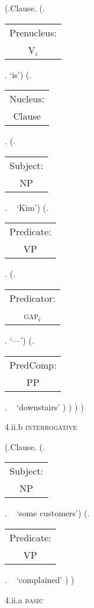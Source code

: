\documentclass[12pt,letterpaper]{article}
\begin{document}
\begin{figure}
	\begin{center}
		\begin{parsetree}
			(.Clause.
			(.\begin{tabular}{c}Prenucleus:\\V$_i$\end{tabular}. `is')
			(.\begin{tabular}{c}Nucleus:\\Clause\end{tabular}.
			(.\begin{tabular}{c}Subject:\\NP\end{tabular}.  ~ `Kim')
			(.\begin{tabular}{c}Predicate:\\VP\end{tabular}.
			(.\begin{tabular}{c}Predicator:\\\textsc{gap}$_i$\end{tabular}. `---')
			(.\begin{tabular}{c}PredComp:\\PP\end{tabular}. ~  `downstairs' )
			)
			)
			)
			
			\hfill \break\hfill \break
		\end{parsetree}
		4.ii.b \textsc{interrogative}
	\end{center}
\end{figure}

	\begin{figure}
	\begin{center}
		\begin{parsetree}
			(.Clause.
			(.\begin{tabular}{c}Subject:\\NP\end{tabular}.  ~ `some customers')
			(.\begin{tabular}{c}Predicate:\\VP\end{tabular}. ~  `complained' )
			)
			
			\hfill \break\hfill \break
		\end{parsetree}
		4.ii.a \textsc{basic}
	\end{center}
\end{figure}
\end{document}

